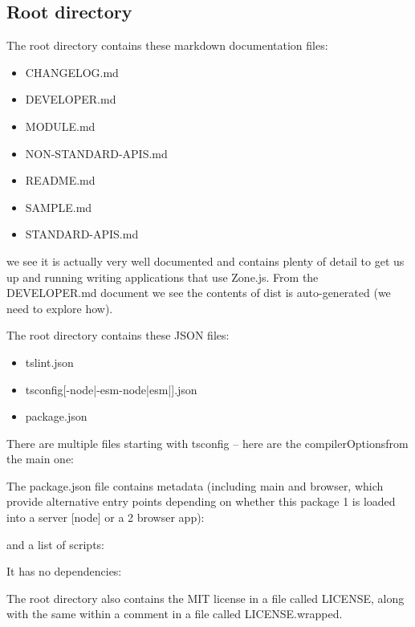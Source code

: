 \subsection{Root directory}

The root directory contains these markdown documentation files:

\begin{itemize}
  \item CHANGELOG.md
  \item DEVELOPER.md
  \item MODULE.md
  \item NON-STANDARD-APIS.md
  \item README.md
  \item SAMPLE.md
  \item STANDARD-APIS.md
\end{itemize}

we see it is actually very well
documented and contains plenty of detail to get us up and running writing applications
that use Zone.js. From the DEVELOPER.md document we see the contents of dist is
auto-generated (we need to explore how).

The root directory contains these JSON files:

\begin{itemize}
  \item tslint.json
  \item tsconfig[-node|-esm-node|esm|].json
  \item package.json
\end{itemize}

There are multiple files starting with tsconfig – here are the compilerOptionsfrom the
main one:



The package.json file contains metadata (including main and browser, which provide
alternative entry points depending on whether this package
1
is loaded into a server
[node] or a
2
browser app):



and a list of scripts:



It has no dependencies:



The root directory also contains the MIT license in a file called LICENSE, along with
the same within a comment in a file called LICENSE.wrapped.

